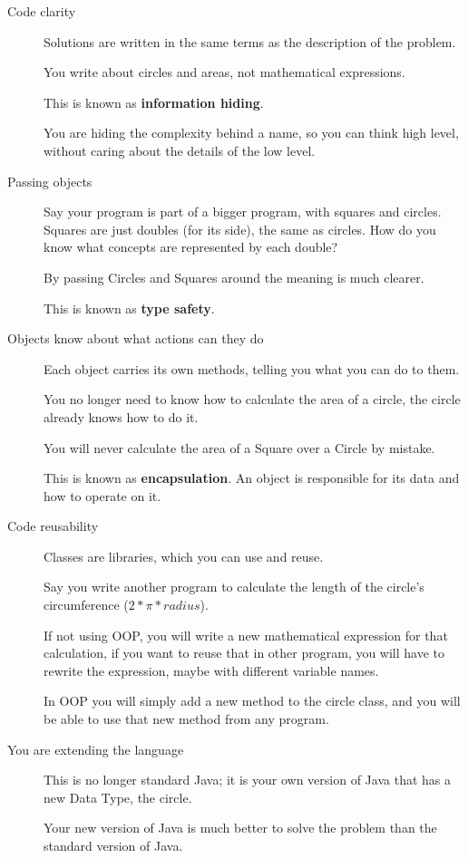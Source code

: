 \documentclass[a4paper, 9pt]{extarticle}
\begin{document}
\begin{description}

  \item[Code clarity] Solutions are written in the same terms as the
    description of the problem.

    You write about circles and areas, not mathematical expressions.

    This is known as \textbf{information hiding}.

    You are hiding the complexity behind a name, so you can think high level,
    without caring about the details of the low level.

  \item[Passing objects] Say your program is part of a bigger program, with
    squares and circles. Squares are just doubles (for its side), the same as
    circles. How do you know what concepts are represented by each double?

    By passing Circles and Squares around the meaning is much clearer.

    This is known as \textbf{type safety}.

  \item[Objects know about what actions can they do] Each object carries its
    own methods, telling you what you can do to them.

    You no longer need to know how to calculate the area of a circle, the
    circle already knows how to do it.

    You will never calculate the area of a Square over a Circle by mistake.

    This is known as \textbf{encapsulation}. An object is responsible for its data
    and how to operate on it.

  \item[Code reusability]

    Classes are libraries, which you can use and reuse.

    Say you write another program to calculate the length of the circle's
    circumference ($2*\pi*radius$).

    If not using OOP, you will write a new mathematical expression for that
    calculation, if you want to reuse that in other program, you will have to
    rewrite the expression, maybe with different variable names.

    In OOP you will simply add a new method to the circle class, and you will
    be able to use that new method from any program.

  \item[You are extending the language] This is no longer standard Java; it is
    your own version of Java that has a new Data Type, the circle.

    Your new version of Java is much better to solve the problem than the
    standard version of Java.

\end{description}
\end{document}
